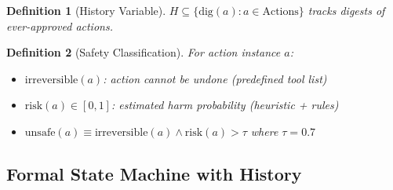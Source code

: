 \documentclass[12pt]{article}
\newtheorem{definition}{Definition}[section]
\begin{document}
\begin{definition}[History Variable]
$H \subseteq \{\mathrm{dig}(a) : a \in \text{Actions}\}$ tracks digests of ever-approved actions.
\end{definition}

\begin{definition}[Safety Classification]
For action instance $a$:
\begin{itemize}
    \item $\text{irreversible}(a)$: action cannot be undone (predefined tool list)
    \item $\text{risk}(a) \in [0,1]$: estimated harm probability (heuristic + rules)
    \item $\text{unsafe}(a) \equiv \text{irreversible}(a) \land \text{risk}(a) > \tau$ where $\tau=0.7$
\end{itemize}
\end{definition}

\subsection{Formal State Machine with History}
\end{document}
